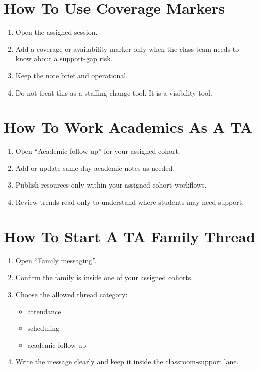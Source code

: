 \documentclass[11pt]{article}
\begin{document}
\section*{How To Use Coverage Markers}
\begin{enumerate}
  \item Open the assigned session.
  \item Add a coverage or availability marker only when the class team needs to know about a support-gap risk.
  \item Keep the note brief and operational.
  \item Do not treat this as a staffing-change tool. It is a visibility tool.
\end{enumerate}

\section*{How To Work Academics As A TA}
\begin{enumerate}
  \item Open ``Academic follow-up'' for your assigned cohort.
  \item Add or update same-day academic notes as needed.
  \item Publish resources only within your assigned cohort workflows.
  \item Review trends read-only to understand where students may need support.
\end{enumerate}

\section*{How To Start A TA Family Thread}
\begin{enumerate}
  \item Open ``Family messaging''.
  \item Confirm the family is inside one of your assigned cohorts.
  \item Choose the allowed thread category:
  \begin{itemize}
    \item attendance
    \item scheduling
    \item academic follow-up
  \end{itemize}
  \item Write the message clearly and keep it inside the classroom-support lane.
\end{enumerate}
\end{document}
